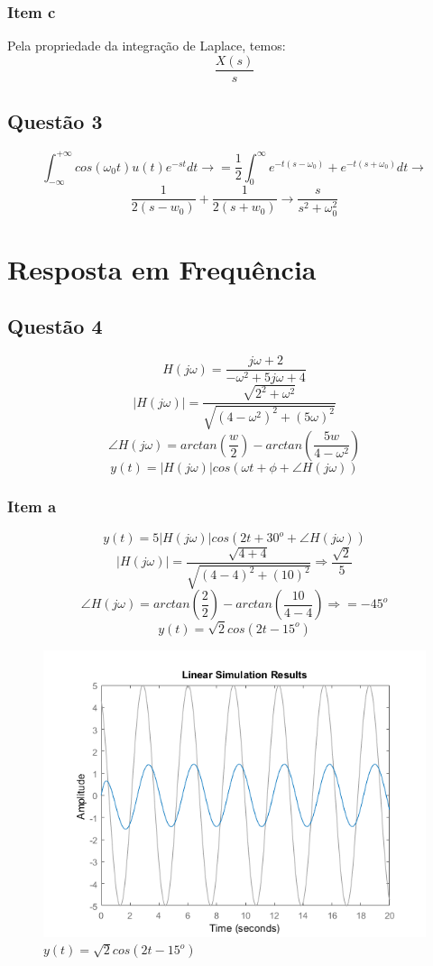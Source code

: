 \documentclass[a4paper, 12pt]{article}
\begin{document}
        \subsubsection{Item c}
        Pela propriedade da integração de Laplace, temos:
        \[\frac{X(s)}{s}\]
    \subsection{Quest\~{a}o 3}
    \[\int_{-\infty}^{+\infty} cos(\omega_{0}t)u(t)e^{-st}dt \rightarrow = \frac{1}{2}\int_{0}^{\infty} e^{-t(s-\omega _{0})} + e^{-t(s+\omega _{0})}dt \rightarrow \]
    \[\frac{1}{2(s-w_{0})} + \frac{1}{2(s+w_{0})} \rightarrow \frac{s}{s^{2} + \omega _{0}^{2} } \]
\section{Resposta em Frequ\^{e}ncia}
    \subsection{Quest\~{a}o 4}
	    \[H(j\omega)  = \frac{j\omega + 2}{-\omega ^{2} + 5j\omega + 4} \]
	    \[|H(j\omega)| = \frac{\sqrt{2^{2} + {\omega ^{2}}}}{\sqrt{(4 -\omega ^{2})^{2} + (5\omega)^{2}}} \] \[\angle H(j\omega) = arctan \left(\frac{w}{2}\right) - arctan \left(\frac{5w}{4-\omega ^{2}}\right) \]
	    \[y(t) = |H(j\omega)|cos(\omega t + \phi + \angle H(j\omega))\]
        \subsubsection{Item a}
        \[y(t) = 5|H(j\omega)|cos(2t + 30^{o} + \angle H(j\omega))\]
        \[|H(j\omega)| = \frac{\sqrt{4 + 4}}{\sqrt{(4 -4)^{2} + (10)^{2}}} \Rightarrow \frac{\sqrt{2}}{5} \]
        \[\angle H(j\omega) = arctan \left(\frac{2}{2}\right) - arctan \left(\frac{10}{4-4}\right) \Rightarrow = -45^{o}\]
        \[y(t) = \sqrt{2}cos(2t -15^{o})\]
		\begin{figure}[!ht]
			\centering
			\includegraphics{img/Q4a.png}
			\caption{$y(t) = \sqrt{2}cos(2t -15^{o})$}	
		\end{figure}	         
\end{document}
